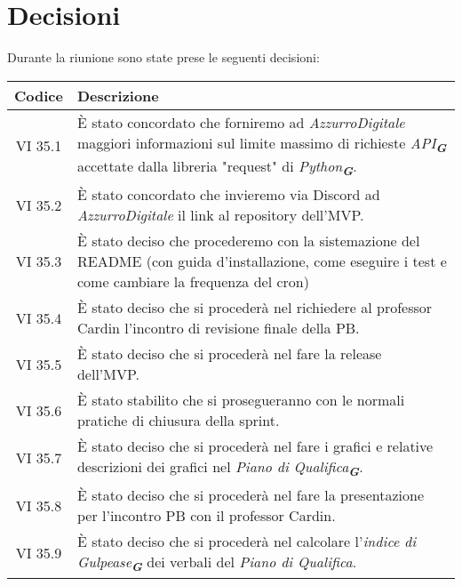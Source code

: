 
\section{Decisioni}

Durante la riunione sono state prese le seguenti decisioni:

\vspace{0.5cm}

\begin{table}[htbp]
    \centering
    \begin{tabular}{|c|p{}|}
        \hline
        \rowcolor[gray]{0.75}
        \textbf{Codice} & \textbf{Descrizione}\\
        \hline
        VI 35.1 & È stato concordato che forniremo ad \emph{AzzurroDigitale} maggiori informazioni sul limite massimo di richieste \emph{API}\textsubscript{\textit{\textbf{G}}} accettate dalla libreria "request" di \emph{Python}\textsubscript{\textit{\textbf{G}}}.\\
        \hline
        VI 35.2 & È stato concordato che invieremo via Discord ad \emph{AzzurroDigitale} il link al repository dell'MVP.\\
        \hline
        VI 35.3 & È stato deciso che procederemo con la sistemazione del README (con guida d'installazione, come eseguire i test e come cambiare la frequenza del cron)\\
        \hline 
        VI 35.4 & È stato deciso che si procederà nel richiedere al professor Cardin l'incontro di revisione finale della PB.\\
        \hline
        VI 35.5 & È stato deciso che si procederà nel fare la release dell'MVP.\\
        \hline
        VI 35.6 & È stato stabilito che si prosegueranno con le normali pratiche di chiusura della sprint.\\
        \hline
        VI 35.7 & È stato deciso che si procederà nel fare i grafici e relative descrizioni dei grafici nel \emph{Piano di Qualifica}\textsubscript{\textit{\textbf{G}}}.\\
        \hline
        VI 35.8 & È stato deciso che si procederà nel fare la presentazione per l'incontro PB con il professor Cardin.\\
        \hline
        VI 35.9 & È stato deciso che si procederà nel calcolare l'\emph{indice di Gulpease}\textsubscript{\textit{\textbf{G}}} dei verbali del \emph{Piano di Qualifica}.\\

\end{tabular}
\end{table}
